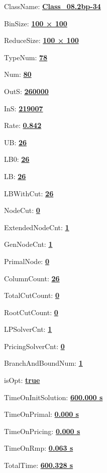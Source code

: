 \documentclass[11pt]{article}
\begin{document}
\pagestyle{empty}


ClassName: \underline{\textbf{Class_08.2bp-34}}
\par
BinSize: \underline{\textbf{100 × 100}}
\par
ReduceSize: \underline{\textbf{100 × 100}}
\par
TypeNum: \underline{\textbf{78}}
\par
Num: \underline{\textbf{80}}
\par
OutS: \underline{\textbf{260000}}
\par
InS: \underline{\textbf{219007}}
\par
Rate: \underline{\textbf{0.842}}
\par
UB: \underline{\textbf{26}}
\par
LB0: \underline{\textbf{26}}
\par
LB: \underline{\textbf{26}}
\par
LBWithCut: \underline{\textbf{26}}
\par
NodeCut: \underline{\textbf{0}}
\par
ExtendedNodeCnt: \underline{\textbf{1}}
\par
GenNodeCnt: \underline{\textbf{1}}
\par
PrimalNode: \underline{\textbf{0}}
\par
ColumnCount: \underline{\textbf{26}}
\par
TotalCutCount: \underline{\textbf{0}}
\par
RootCutCount: \underline{\textbf{0}}
\par
LPSolverCnt: \underline{\textbf{1}}
\par
PricingSolverCnt: \underline{\textbf{0}}
\par
BranchAndBoundNum: \underline{\textbf{1}}
\par
isOpt: \underline{\textbf{true}}
\par
TimeOnInitSolution: \underline{\textbf{600.000 s}}
\par
TimeOnPrimal: \underline{\textbf{0.000 s}}
\par
TimeOnPricing: \underline{\textbf{0.000 s}}
\par
TimeOnRmp: \underline{\textbf{0.063 s}}
\par
TotalTime: \underline{\textbf{600.328 s}}
\par
\newpage


\end{document}
